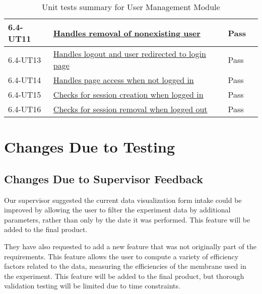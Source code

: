 \documentclass[12pt, titlepage]{article}
\begin{document}
\begin{table}[H]
\begin{tabular}{|l|l|l|l|}
    \hline
    6.4-UT11 & \href{https://github.com/SumanyaG/Alkalytics/blob/main/src/backend/test/userServiceTest.py}{Handles removal of nonexisting user} & Pass\\
    \hline
    6.4-UT13 & \href{https://github.com/SumanyaG/Alkalytics/blob/main/src/frontend/test/components/auth/AccountMenu.test.tsx}{Handles logout and user redirected to login page} & Pass\\
    \hline
    6.4-UT14 & \href{https://github.com/SumanyaG/Alkalytics/blob/main/src/frontend/test/components/auth/ProtectedRoute.test.tsx}{Handles page access when not logged in} & Pass\\
    \hline
    6.4-UT15 & \href{https://github.com/SumanyaG/Alkalytics/blob/main/src/frontend/test/context/authContext.test.tsx}{Checks for session creation when logged in} & Pass\\
    \hline
    6.4-UT16 & \href{https://github.com/SumanyaG/Alkalytics/blob/main/src/frontend/test/context/authContext.test.tsx}{Checks for session removal when logged out} & Pass\\
    \hline
  \end{tabular}
  \caption{Unit tests summary for User Management Module}
  \label{UT:UM}
\end{table}

\section{Changes Due to Testing}
\subsection{Changes Due to Supervisor Feedback}

Our supervisor suggested the current data visualization form intake could be
improved by allowing the user to filter the experiment data by additional
parameters, rather than only by the date it was performed. This feature will be
added to the final product.

They have also requested to add a new feature that was not originally part of
the requirements. This feature allows the user to compute a variety of
efficiency factors related to the data, measuring the efficiencies of the
membrane used in the experiment. This feature will be added to the final
product, but thorough validation testing will be limited due to time
constraints.


\end{document}
